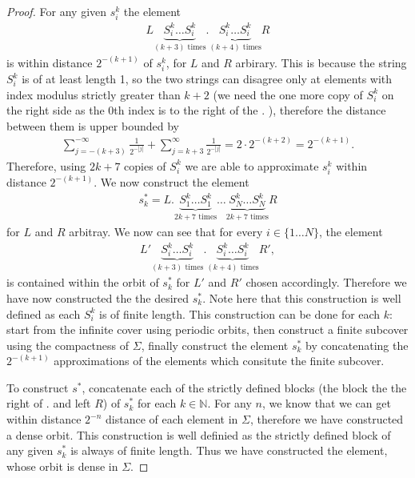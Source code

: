 \begin{proof}
For any given $s_{i}^{k}$ the element
\begin{align}
	{L} \underbrace{S_{i}^{k} \ldots S_{i}^{k}}_{(k+3) \textrm{ times} }\bm{.}  \underbrace{S_{i}^{k} \ldots S_{i}^{k}}_{(k+4) \textrm{ times} } {R}
\end{align}
is within distance $2^{-(k+1)}$ of $s_{i}^{k}$, for $L$ and $R$ arbirary. This is because the string $S_{i}^{k}$ is of at least length 1, so the two strings can disagree only at elements with index modulus strictly greater than $k+2$ (we need the one more copy of $S_{i}^{k}$ on the right side as the 0th index is to the right of the $\bm{.} $ ), therefore the distance between them is upper bounded by
	\begin{align}
		\sum_{j=-(k+3)}^{-\infty }\frac{1}{2^{-|j|}} + \sum_{j = k+3}^{\infty } \frac{1}{2^{-|j|}} = 2 \cdot 2^{-(k+2)} = 2^{-(k+1)}.   	
	\end{align}
	Therefore, using $2k+7$ copies of $S_{i}^{k}$ we are able to approximate $s_{i}^{k}$ within distance $2^{-(k+1)}$. We now construct the element
	\begin{align}
		s_{k}^{*} = L \bm{.} \underbrace{S_{1}^{k} \ldots S_{1}^{k}}_{2k+7  \textrm{ times} } \ldots \underbrace{S_{N}^{k} \ldots S_{N}^{k}}_{2k+7  \textrm{ times} } R
	\end{align}
	for $L$ and $R$ arbitray. We now can see that for every $i\in\{1 \ldots N\}$, the element 
	\begin{align}
		L' \underbrace{S_{i}^{k} \ldots S_{i}^{k}}_{(k+3) \textrm{ times} } \bm{.} 
		\underbrace{S_{i}^{k} \ldots S_{i}^{k}}_{(k+4) \textrm{ times} } R',
	\end{align}
	is contained within the orbit of $s_{k}^{*}$ for $L'$ and $R'$ chosen accordingly. Therefore we have now constructed the the desired $s_{k}^{*}$. Note here that this construction is well defined as each $S_{i}^{k}$ is of finite length. This construction can be done for each $k$: start from the infinite cover using periodic orbits, then construct a finite subcover using the compactness of $\Sigma$, finally construct the element $s_{k}^{*}$ by concatenating the $2^{-(k+1)}$ approximations of the elements which consitute the finite subcover. 

	To construct $s^{*}$, concatenate each of the strictly defined blocks (the block the the right of $\bm{.} $ and left $R$) of $s_{k}^{*}$ for each $k \in \mathbb{N}$. For any $n$, we know that we can get within distance $2^{-n}$ distance of each element in $\Sigma$, therefore we have constructed a dense orbit. This construction is well definied as the strictly defined block of any given $s_{k}^{*}$ is always of finite length. Thus we have constructed the element, whose orbit is dense in $\Sigma$.
\end{proof}

